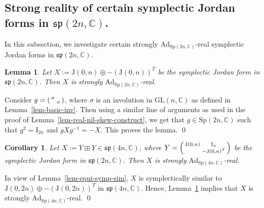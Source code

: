 \documentclass[11pt,reqno]{amsart}
\renewenvironment{proof}{{\bfseries Proof.}}{\qed}
\numberwithin{equation}{section}
\newtheorem{corollary}[theorem]{Corollary}
\newtheorem{lemma}[theorem]{Lemma}
\theoremstyle{definition}
\def\C{\mathbb C}
\def\C{\mathbb {C}}
\newcommand{\lemref}[1]{Lemma~\ref{#1}}
\begin{document}
\subsection{Strong  reality of certain symplectic Jordan forms in $\mathfrak{sp}(2n,\mathbb{C})$.} In this subsection, we investigate certain strongly $\mathrm{Ad}_{\mathrm{Sp}(2n,\mathbb{C})}$-real symplectic Jordan forms in $\mathfrak{sp}(2n,\mathbb{C})$.

\begin{lemma}\label{lem-str-real-odd-nil}
Let $X:= \mathrm{J}(0, n) \oplus - (\mathrm{J}(0, n))^{T}$ be the symplectic Jordan form in $\mathfrak{sp}(2n,\mathbb{C})$. Then $X$ is strongly $\mathrm{Ad}_{\mathrm{Sp}(2n,\mathbb{C})}$-real.
\end{lemma}
\begin{proof}
Consider $g=  \begin{psmallmatrix}
		\sigma & \\
		& \sigma
	\end{psmallmatrix}$, where $\sigma $ is an involution in $\mathrm{GL}(n,\C)$ as defined in \lemref{lem-basic-inv}. Then using a similar line of arguments as used in the proof of \lemref{lem-real-nil-skew-construct}, we get that $g \in \mathrm{Sp}(2n,\mathbb{C})$ such that $ g^2= \mathrm{I}_{2n}$  and $gXg^{-1}=-X$. This proves the lemma.
\end{proof}



\begin{corollary}\label{cor-str-real-pair-even-nil}
Let $X :=Y \boxplus Y \in \mathfrak{sp}(4n,\mathbb{C}) $, where $Y=  \begin{psmallmatrix}
		\mathrm{J}(0,n) & \mathrm{I}_{n} \\
		& - \mathrm{J}(0,n)^{T}
	\end{psmallmatrix}$ be the symplectic Jordan form in $\mathfrak{sp}(2n,\mathbb{C})$. Then $X$ is strongly $\mathrm{Ad}_{\mathrm{Sp}(4n,\mathbb{C})}$-real.
\end{corollary}
\begin{proof}
In view of \lemref{lem-equi-symp-sim}, 	$X$ is symplectically similar to $\mathrm{J}(0, 2n) \oplus - (\mathrm{J}(0, 2n))^{T}$ in $\mathfrak{sp}(4n,\mathbb{C}) $. Hence, \lemref{lem-str-real-odd-nil} implies that $X$ is strongly $\mathrm{Ad}_{\mathrm{Sp}(4n,\mathbb{C})}$-real.
\end{proof}
\end{document}
